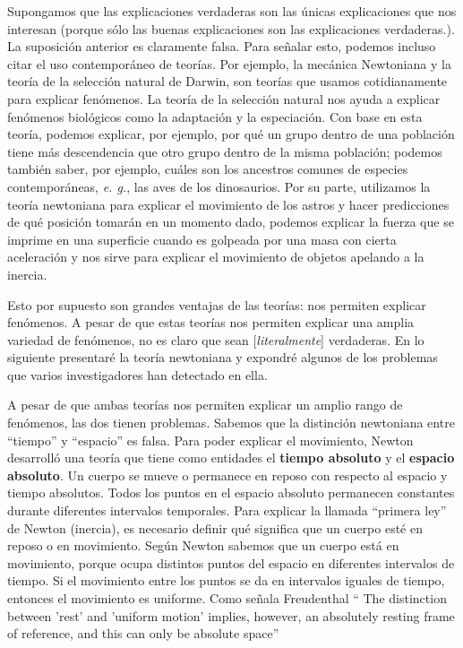 \documentclass{article}
\begin{document}
Supongamos que las explicaciones verdaderas son las únicas explicaciones que nos interesan (porque sólo las buenas explicaciones son las explicaciones verdaderas.). La suposición anterior es claramente falsa. Para señalar esto, podemos incluso citar el uso contemporáneo de teorías. Por ejemplo, la mecánica Newtoniana y la teoría de la selección natural de Darwin, son teorías que usamos cotidianamente para explicar fenómenos. La teoría de la selección natural nos ayuda a explicar fenómenos biológicos como la adaptación y la especiación. Con base en esta teoría, podemos explicar, por ejemplo, por qué un grupo dentro de una población tiene más descendencia que otro grupo dentro de la misma población; podemos también saber, por ejemplo, cuáles son los ancestros comunes de especies contemporáneas, \textit{e. g.}, las aves de los dinosaurios. Por su parte, utilizamos la teoría newtoniana para explicar el movimiento de los astros y hacer predicciones de qué posición tomarán en un momento dado, podemos explicar la fuerza que se imprime en una superficie cuando es golpeada por una masa con cierta aceleración y nos sirve para explicar el movimiento de objetos apelando a la inercia.

Esto por supuesto son grandes ventajas de las teorías: nos permiten explicar fenómenos. A pesar de que estas teorías nos permiten explicar una amplia variedad de fenómenos, no es claro que sean [\textit{literalmente}] verdaderas. En lo siguiente presentaré la teoría newtoniana y expondré algunos de los problemas que varios investigadores han detectado en ella.

A pesar de que ambas teorías nos permiten explicar un amplio rango de fenómenos, las dos tienen problemas. Sabemos que la distinción newtoniana entre ``tiempo'' y ``espacio'' es falsa. Para poder explicar el movimiento, Newton desarrolló una teoría que tiene como entidades el \textbf{tiempo absoluto} y el \textbf{espacio absoluto}. Un cuerpo se mueve o permanece en reposo con respecto al espacio y tiempo absolutos. Todos los puntos en el espacio absoluto permanecen constantes durante diferentes intervalos temporales. Para explicar la llamada ``primera ley''  de Newton (inercia), es necesario definir qué significa que un cuerpo esté en reposo o en movimiento. Según Newton sabemos que un cuerpo está en movimiento, porque ocupa distintos puntos del espacio en diferentes intervalos de tiempo. Si el movimiento entre los puntos se da en intervalos iguales de tiempo, entonces el movimiento es uniforme. Como señala Freudenthal `` The distinction between 'rest' and 'uniform motion' implies, however, an absolutely resting frame of reference, and this can only be absolute space'' \citeyear{Freudenthal1986}
\end{document}
